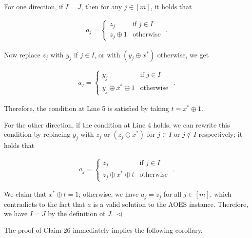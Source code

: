 For one direction, if $I=J$, then for any $j\in[m]$, it holds that\par


\[\begin{gathered}
a_{j}=\begin{cases}z_{j}&\text{if }j\in I\\
z_{j}\oplus 1&\text{otherwise }\end{cases}.
\end{gathered}\]




Now replace $z_{j}$ with $y_{j}$ if $j\in I$, or with $(y_{j}\oplus x^{*})$ otherwise, we get\par


\[\begin{gathered}
a_{j}=\begin{cases}y_{j}&\text{if }j\in I\\
y_{j}\oplus x^{*}\oplus 1&\text{otherwise }\end{cases}.
\end{gathered}\]




Therefore, the condition at Line 5 is satisfied by taking $t=x^{*}\oplus 1$.\par




For the other direction, if the condition at Line 4 holds, we can rewrite this condition by replacing $y_{j}$ with $z_{j}$ or $(z_{j}\oplus x^{*})$ for $j\in I$ or $j\not\in I$ respectively; it holds that\par


\[\begin{gathered}
a_{j}=\begin{cases}z_{j}&\text{if }j\in I\\
z_{j}\oplus x^{*}\oplus t&\text{otherwise }\end{cases}.
\end{gathered}\]




We claim that $x^{*}\oplus t=1$; otherwise, we have $a_{j}=z_{j}$ for all $j\in[m]$, which contradicts to the fact that $a$ is a valid solution to the AOES instance. Therefore, we have $I=J$ by the definition of $J$.
$\vartriangleleft$\par




The proof of Claim 26 immediately implies the following corollary.\par



